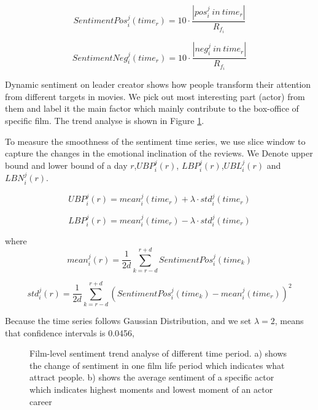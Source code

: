 \begin{equation}
    SentimentPos^j_i (time_r) = 10\cdot \frac{|pos^j_i \ in \ time_r|}{R_{f_i}}
\end{equation}

\begin{equation}
    SentimentNeg^j_i (time_r) = 10\cdot \frac{|neg^j_i \ in \ time_r|}{R_{f_i}}
\end{equation}

\par Dynamic sentiment on leader creator shows how people transform their attention from different targets in movies. We pick out most interesting part (actor) from them and label it the main factor which mainly contribute to the box-office of specific film. The trend analyse is shown in Figure \ref{fig:sentiment}.

\par To measure the smoothness of the sentiment time series, we use slice window to capture the changes in the emotional inclination of the reviews. We Denote upper bound and lower bound of a day $r$,$UBP^j_i (r)$, $LBP^j_i (r)$,$UBL^j_i (r)$ and $LBN^j_i (r)$. 

\begin{equation}
    UBP^j_i (r) = mean^j_i (time_r)+\lambda \cdot std^j_i (time_r)
\end{equation}

\begin{equation}
    LBP^j_i (r) = mean^j_i (time_r)-\lambda \cdot std^j_i (time_r)
\end{equation}

where 
\begin{equation}
    mean^j_i (r) = \frac{1}{2d}\sum_{k=r-d}^{r+d}SentimentPos^j_i (time_k)
\end{equation}

\begin{equation}
    std^j_i (r) = \frac{1}{2d}\sum_{k=r-d}^{r+d}(SentimentPos^j_i (time_k)- mean^j_i (time_r))^2
\end{equation}

\par Because the time series follows Gaussian Distribution, and we set $\lambda=2$, means that confidence intervals is 0.0456, 

\begin{figure}[!htbp]
\centering
{}
\hfill
{}
\caption{Film-level sentiment trend analyse of different time period. a) shows the change of sentiment in one film life period which indicates what attract people. b) shows the average sentiment of a specific actor which indicates highest moments and lowest moment of an actor career }
\label{fig:sentiment}
\end{figure}


